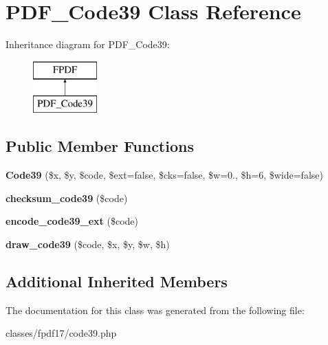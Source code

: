 \hypertarget{classPDF__Code39}{\section{P\+D\+F\+\_\+\+Code39 Class Reference}
\label{classPDF__Code39}
}
Inheritance diagram for P\+D\+F\+\_\+\+Code39\+:\begin{figure}[H]
\begin{center}
\leavevmode
\includegraphics[height=2.000000cm]{d1/d2e/classPDF__Code39}
\end{center}
\end{figure}
\subsection*{Public Member Functions}
\begin{DoxyCompactItemize}
\item 
\hypertarget{classPDF__Code39_af4c1115767f937ff6ebd8939a71d1fb7}{{\bfseries Code39} (\$x, \$y, \$code, \$ext=false, \$cks=false, \$w=0., \$h=6, \$wide=false)}\label{classPDF__Code39_af4c1115767f937ff6ebd8939a71d1fb7}

\item 
\hypertarget{classPDF__Code39_a99c09cf64de507faa0e30249a56a9328}{{\bfseries checksum\+\_\+code39} (\$code)}\label{classPDF__Code39_a99c09cf64de507faa0e30249a56a9328}

\item 
\hypertarget{classPDF__Code39_aa66093e56e8d54245f870a4a4251ada9}{{\bfseries encode\+\_\+code39\+\_\+ext} (\$code)}\label{classPDF__Code39_aa66093e56e8d54245f870a4a4251ada9}

\item 
\hypertarget{classPDF__Code39_af7e330f3447f390286885bcbab24af42}{{\bfseries draw\+\_\+code39} (\$code, \$x, \$y, \$w, \$h)}\label{classPDF__Code39_af7e330f3447f390286885bcbab24af42}

\end{DoxyCompactItemize}
\subsection*{Additional Inherited Members}


The documentation for this class was generated from the following file\+:\begin{DoxyCompactItemize}
\item 
classes/fpdf17/code39.\+php\end{DoxyCompactItemize}
